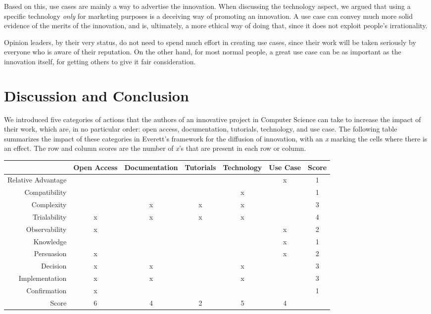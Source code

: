 \documentclass[12pt]{article}
\begin{document}
Based on this, use cases are mainly a way to advertise the innovation. When discussing the technology aspect, we argued that using a specific technology \emph{only} for marketing purposes is a deceiving way of promoting an innovation. A use case can convey much more solid evidence of the merits of the innovation, and is, ultimately, a more ethical way of doing that, since it does not exploit people's irrationality.

Opinion leaders, by their very status, do not need to spend much effort in creating use cases, since their work will be taken seriously by everyone who is aware of their reputation. On the other hand, for most normal people, a great use case can be as important as the innovation itself, for getting others to give it fair consideration.

\section{Discussion and Conclusion}
\label{sec:org5ccd1f5}
We introduced five categories of actions that the authors of an innovative project in Computer Science can take to increase the impact of their work, which are, in no particular order: open access, documentation, tutorials, technology, and use case. The following table summarizes the impact of these categories in Everett's framework for the diffusion of innovation, with an \emph{x} marking the cells where there is an effect. The row and column scores are the number of \emph{x}'s that are present in each row or column.


\begin{center}
\begin{tabular}{r|ccccc|c}
 & Open Access & Documentation & Tutorials & Technology & Use Case & Score\\
\hline
Relative Advantage &  &  &  &  & x & 1\\
Compatibility &  &  &  & x &  & 1\\
Complexity &  & x & x & x &  & 3\\
Trialability & x & x & x & x &  & 4\\
Observability & x &  &  &  & x & 2\\
\hline
Knowledge &  &  &  &  & x & 1\\
Persuasion & x &  &  &  & x & 2\\
Decision & x & x &  & x &  & 3\\
Implementation & x & x &  & x &  & 3\\
Confirmation & x &  &  &  &  & 1\\
\hline
Score & 6 & 4 & 2 & 5 & 4 & \\
\end{tabular}
\end{center}
\end{document}
